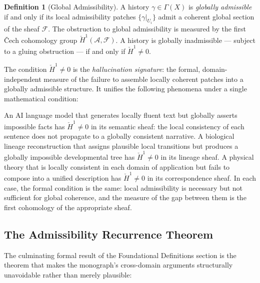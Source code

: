 \documentclass[12pt,openany]{book}
\theoremstyle{plain}
\theoremstyle{definition}
\newtheorem{definition}[theorem]{Definition}
\theoremstyle{remark}
\begin{document}
\begin{definition}[Global Admissibility]
A history $\gamma \in \Gamma(X)$ is \emph{globally admissible} if and only if its local admissibility patches $\{\gamma|_{U_i}\}$ admit a coherent global section of the sheaf $\mathcal{F}$. The obstruction to global admissibility is measured by the first \v{C}ech cohomology group $\check{H}^1(\mathcal{A}, \mathcal{F})$. A history is globally inadmissible — subject to a gluing obstruction — if and only if $\check{H}^1 \neq 0$.
\end{definition}

The condition $\check{H}^1 \neq 0$ is the \emph{hallucination signature}: the formal, domain-independent measure of the failure to assemble locally coherent patches into a globally admissible structure. It unifies the following phenomena under a single mathematical condition:

An AI language model that generates locally fluent text but globally asserts impossible facts has $\check{H}^1 \neq 0$ in its semantic sheaf: the local consistency of each sentence does not propagate to a globally consistent narrative. A biological lineage reconstruction that assigns plausible local transitions but produces a globally impossible developmental tree has $\check{H}^1 \neq 0$ in its lineage sheaf. A physical theory that is locally consistent in each domain of application but fails to compose into a unified description has $\check{H}^1 \neq 0$ in its correspondence sheaf. In each case, the formal condition is the same: local admissibility is necessary but not sufficient for global coherence, and the measure of the gap between them is the first cohomology of the appropriate sheaf.

\subsection*{The Admissibility Recurrence Theorem}

The culminating formal result of the Foundational Definitions section is the theorem that makes the monograph's cross-domain arguments structurally unavoidable rather than merely plausible:
\end{document}
